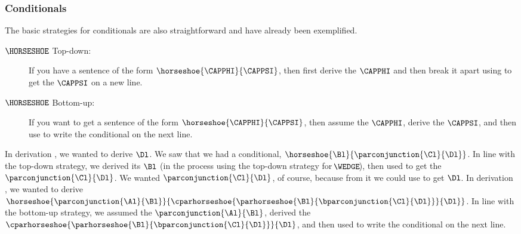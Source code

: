 \subsubsection*{Conditionals}
The basic strategies for conditionals are also straightforward and have already been exemplified. 
\begin{description}
\item[$\HORSESHOE$ Top-down:] If you have a sentence of the form $\horseshoe{\CAPPHI}{\CAPPSI}$, then first derive the  $\CAPPHI$ and then break it apart using  to get the  $\CAPPSI$ on a new line.
\item[$\HORSESHOE$ Bottom-up:] If you want to get a sentence of the form $\horseshoe{\CAPPHI}{\CAPPSI}$, then assume the  $\CAPPHI$, derive the  $\CAPPSI$, and then use  to write the conditional on the next line.
\end{description} 
In derivation , we wanted to derive $\Dl$. 
We saw that we had a conditional, $\horseshoe{\Bl}{\parconjunction{\Cl}{\Dl}}$. 
In line with the top-down strategy, we derived its  $\Bl$ (in the process using the top-down strategy for $\!\WEDGE\!$), then used  to get the  $\parconjunction{\Cl}{\Dl}$. 
We wanted $\parconjunction{\Cl}{\Dl}$, of course, because from it we could use  to get $\Dl$. 
In derivation , we wanted to derive $\horseshoe{\parconjunction{\Al}{\Bl}}{\cparhorseshoe{\parhorseshoe{\Bl}{\bparconjunction{\Cl}{\Dl}}}{\Dl}}$. 
In line with the bottom-up strategy, we assumed the  $\parconjunction{\Al}{\Bl}$, derived the  $\cparhorseshoe{\parhorseshoe{\Bl}{\bparconjunction{\Cl}{\Dl}}}{\Dl}$, and then used  to write the conditional on the next line.

